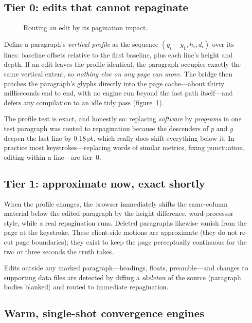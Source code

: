 \documentclass{ltugboat}
\begin{document}
\subsection{Tier 0: edits that cannot repaginate}

\begin{figure}[tb]
\centering

\caption{Routing an edit by its pagination impact.}
\label{fig:tiers}
\end{figure}

Define a paragraph's \emph{vertical profile} as the sequence
$(y_i - y_1, h_i, d_i)$ over its lines: baseline offsets relative to the
first baseline, plus each line's height and depth. If an edit leaves the
profile identical, the paragraph occupies exactly the same vertical
extent, so \emph{nothing else on any page can move}. The bridge then
patches the paragraph's glyphs directly into the page cache---about
thirty milliseconds end to end, with no engine run beyond the fast path
itself---and defers any compilation to an idle tidy pass
(figure~\ref{fig:tiers}).

The profile test is exact, and honestly so: replacing
\emph{software} by \emph{programs} in one test paragraph was routed to
repagination because the descenders of \emph{p} and \emph{g} deepen the
last line by 0.18\,pt, which really does shift everything below it. In
practice most keystrokes---replacing words of similar metrics, fixing
punctuation, editing within a line---are tier~0.

\subsection{Tier 1: approximate now, exact shortly}

When the profile changes, the browser immediately shifts the same-column
material below the edited paragraph by the height difference, word-processor
style, while a real repagination runs. Deleted paragraphs likewise vanish
from the page at the keystroke. These client-side motions are approximate
(they do not re-cut page boundaries); they exist to keep the page
perceptually continuous for the two or three seconds the truth takes.

Edits outside any marked paragraph---headings, floats, preamble---and
changes to supporting data files are detected by diffing a \emph{skeleton}
of the source (paragraph bodies blanked) and routed to immediate
repagination.

\subsection{Warm, single-shot convergence engines}
\end{document}

